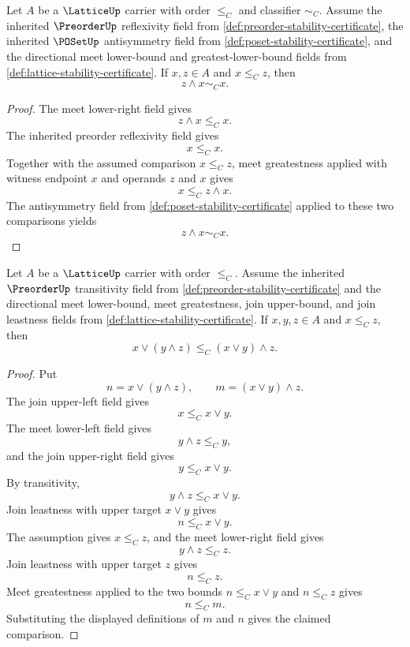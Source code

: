 \begin{lemma}
\label{lem:lattice-meet-absorbs-smaller-ordered-endpoint}
Let $A$ be a $\LatticeUp$ carrier with order $\le_C$ and classifier $\sim_C$. Assume the inherited $\PreorderUp$ reflexivity field from \autoref{def:preorder-stability-certificate}, the inherited $\POSetUp$ antisymmetry field from \autoref{def:poset-stability-certificate}, and the directional meet lower-bound and greatest-lower-bound fields from \autoref{def:lattice-stability-certificate}. If $x,z\in A$ and $x\le_C z$, then
$$
z\wedge x\sim_C x.
$$
\end{lemma}
\begin{proof}
The meet lower-right field gives
$$
z\wedge x\le_C x.
$$
The inherited preorder reflexivity field gives
$$
x\le_C x.
$$
Together with the assumed comparison $x\le_C z$, meet greatestness applied with witness endpoint $x$ and operands $z$ and $x$ gives
$$
x\le_C z\wedge x.
$$
The antisymmetry field from \autoref{def:poset-stability-certificate} applied to these two comparisons yields
$$
z\wedge x\sim_C x.
$$
\end{proof}

\begin{lemma}
\label{lem:lattice-modular-lower-comparison-from-directional-bounds}
Let $A$ be a $\LatticeUp$ carrier with order $\le_C$. Assume the inherited $\PreorderUp$ transitivity field from \autoref{def:preorder-stability-certificate} and the directional meet lower-bound, meet greatestness, join upper-bound, and join leastness fields from \autoref{def:lattice-stability-certificate}. If $x,y,z\in A$ and $x\le_C z$, then
$$
x\vee(y\wedge z)\le_C (x\vee y)\wedge z.
$$
\end{lemma}
\begin{proof}
Put
$$
n=x\vee(y\wedge z),\qquad m=(x\vee y)\wedge z.
$$
The join upper-left field gives
$$
x\le_C x\vee y.
$$
The meet lower-left field gives
$$
y\wedge z\le_C y,
$$
and the join upper-right field gives
$$
y\le_C x\vee y.
$$
By transitivity,
$$
y\wedge z\le_C x\vee y.
$$
Join leastness with upper target $x\vee y$ gives
$$
n\le_C x\vee y.
$$
The assumption gives $x\le_C z$, and the meet lower-right field gives
$$
y\wedge z\le_C z.
$$
Join leastness with upper target $z$ gives
$$
n\le_C z.
$$
Meet greatestness applied to the two bounds $n\le_C x\vee y$ and $n\le_C z$ gives
$$
n\le_C m.
$$
Substituting the displayed definitions of $m$ and $n$ gives the claimed comparison.
\end{proof}

